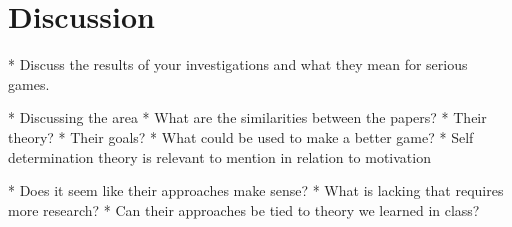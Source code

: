 \section{Discussion}
* Discuss the results of your investigations and what they mean for serious games.

    * Discussing the area
    * What are the similarities between the papers?
        * Their theory?
        * Their goals?
        * What could be used to make a better game?
    * Self determination theory is relevant to mention in relation to motivation

    * Does it seem like their approaches make sense?
        * What is lacking that requires more research?
        * Can their approaches be tied to theory we learned in class?